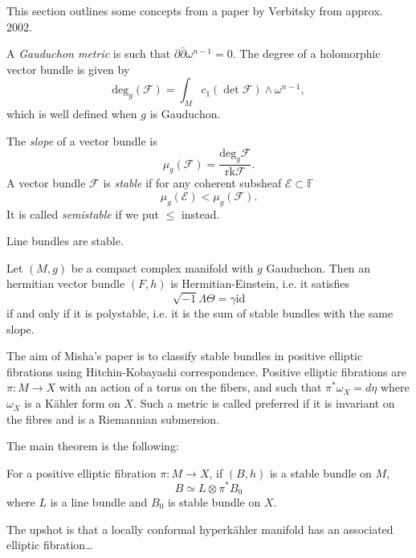 \documentclass{book}
\begin{document}
\noindent
This section outlines some concepts
from a paper by Verbitsky from approx. 2002.

A {\it Gauduchon metric} is such that
$\partial\bar\partial \omega^{n-1}=0$. The
degree of a holomorphic vector bundle is
given by $$ \text{deg}_g(\mathcal{F}) =
\int_M c_1(\det \mathcal{F}) \wedge
\omega^{n-1}, $$ which is well defined when
$g$ is Gauduchon.

\begin{definition}
\label{definition-slope-and-semistability}
The {\it slope} of a vector bundle is
$$
\mu_g(\mathcal{F}) = \frac{\text{deg}_g
\mathcal{F}}{\text{rk}\mathcal{F}}.
$$
A vector bundle $\mathcal{F}$ is {\it stable}
if for any coherent subsheaf $\mathcal{E}
\subset \mathbb{F}$
$$
\mu_g(\mathcal{E}) < \mu_g(\mathcal{F}).
$$
It is called {\it semistable} if we put $\le
$
instead.
\end{definition}

\begin{example}
\label{example-line-bundles-are-stable}
Line bundles are stable.
\end{example}

\begin{theorem}
\label{theorem-hitchin-kobayashi}
Let $(M,g)$ be a compact complex manifold
with $g$ Gauduchon.
Then an hermitian vector bundle $(F,h)$
is Hermitian-Einstein,
i.e. it satisfies
$$
\sqrt{-1}\Lambda\Theta=\gamma\text{id}
$$
if and only if
it is polystable, i.e.
it is the sum of stable bundles
with the same slope.
\end{theorem}

\noindent
The aim of Misha's paper is to
classify stable bundles in positive elliptic
fibrations using Hitchin-Kobayashi
correspondence. Positive elliptic fibrations
are $\pi:M \to X$ with an action of a torus
on the fibers, and such that
$\pi^*\omega_X=d\eta$ where $\omega_X$ is a
Kähler form on $X$. Such a metric is called
preferred if it is invariant on the fibres
and is a Riemannian submersion.

The main theorem is the following:

\begin{theorem}
\label{theorem-stability-misha}
For a positive elliptic fibration $\pi:M \to
X$,
if $(B,h)$ is a stable bundle on $M$,
$$
B \simeq L \otimes \pi^*B_0
$$
where $L$ is a line bundle and
$B_0$ is stable bundle on $X$.
\end{theorem}

\noindent
The upshot is that a locally conformal
hyperkähler manifold
has an associated elliptic fibration…
\end{document}

